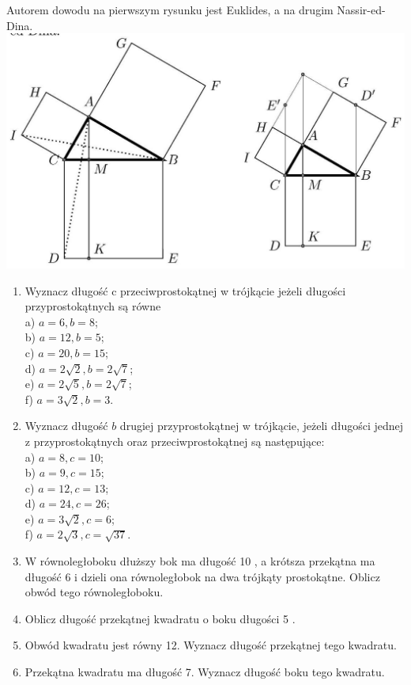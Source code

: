 \documentclass[10pt]{article}
\begin{document}
Autorem dowodu na pierwszym rysunku jest Euklides, a na drugim Nassir-ed-Dina.\\
\includegraphics[max width=\textwidth, center]{2024_11_21_71f62bd117d375398909g-123(2)}

\begin{enumerate}
  \item Wyznacz długość c przeciwprostokątnej w trójkącie jeżeli długości przyprostokątnych są równe\\
a) \(a=6, b=8\);\\
b) \(a=12, b=5\);\\
c) \(a=20, b=15\);\\
d) \(a=2 \sqrt{2}, b=2 \sqrt{7}\);\\
e) \(a=2 \sqrt{5}, b=2 \sqrt{7}\);\\
f) \(a=3 \sqrt{2}, b=3\).
  \item Wyznacz długość \(b\) drugiej przyprostokątnej w trójkącie, jeżeli długości jednej z przyprostokątnych oraz przeciwprostokątnej są następujące:\\
a) \(a=8, c=10\);\\
b) \(a=9, c=15\);\\
c) \(a=12, c=13\);\\
d) \(a=24, c=26\);\\
e) \(a=3 \sqrt{2}, c=6\);\\
f) \(a=2 \sqrt{3}, c=\sqrt{37}\).
  \item W równoległoboku dłuższy bok ma długość 10 , a krótsza przekątna ma długość 6 i dzieli ona równoległobok na dwa trójkąty prostokątne. Oblicz obwód tego równoległoboku.
  \item Oblicz długość przekątnej kwadratu o boku długości 5 .
  \item Obwód kwadratu jest równy 12. Wyznacz długość przekątnej tego kwadratu.
  \item Przekątna kwadratu ma długość 7. Wyznacz długość boku tego kwadratu.
\end{enumerate}
\end{document}
